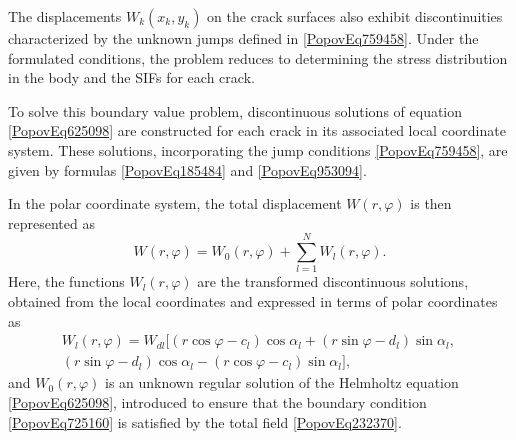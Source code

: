 The displacements \( W_k(x_k, y_k) \) on the crack surfaces also exhibit discontinuities characterized by the unknown jumps defined in \eqref{PopovEq759458}. Under the formulated conditions, the problem reduces to determining the stress distribution in the body and the SIFs for each crack.

To solve this boundary value problem, discontinuous solutions of equation \eqref{PopovEq625098} are constructed for each crack in its associated local coordinate system. These solutions, incorporating the jump conditions \eqref{PopovEq759458}, are given by formulas \eqref{PopovEq185484} and \eqref{PopovEq953094}.

In the polar coordinate system, the total displacement \( W(r, \varphi) \) is then represented as
\begin{equation} \label{PopovEq232370} 
	W(r, \varphi) = W_0(r, \varphi) + \sum_{l=1}^{N} W_l(r, \varphi).
\end{equation}
Here, the functions \( W_l(r, \varphi) \) are the transformed discontinuous solutions, obtained from the local coordinates and expressed in terms of polar coordinates as
\begin{multline*}
	W_l(r, \varphi) = W_{dl} \Big[ (r\cos \varphi - c_l)\cos \alpha_l + (r\sin \varphi - d_l)\sin \alpha_l,\,
	\\
	(r\sin \varphi - d_l)\cos \alpha_l - (r\cos \varphi - c_l)\sin \alpha_l \Big],
\end{multline*}
and \( W_0(r, \varphi) \) is an unknown regular solution of the Helmholtz equation \eqref{PopovEq625098}, introduced to ensure that the boundary condition \eqref{PopovEq725160} is satisfied by the total field \eqref{PopovEq232370}.

